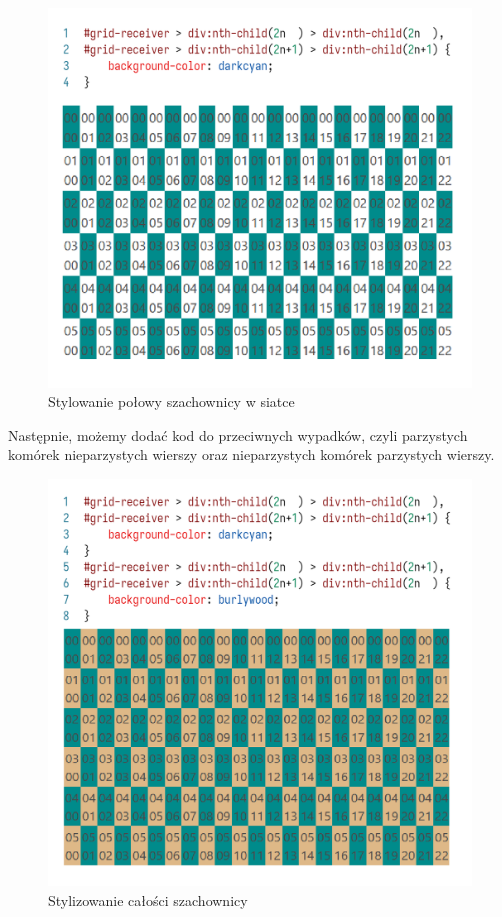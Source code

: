 \documentclass[licencjacka]{pracadypl}
\begin{document}
\begin{figure}[H]
  \centering
  \includegraphics[width=\linewidth/\real{1.6}]{images/codeui-checkerboard-half-coloring.png}
  \caption{Stylowanie połowy szachownicy w siatce}
  \label{fig:codeui-checkerboard-half-coloring}
\end{figure}

Następnie, możemy dodać kod do przeciwnych wypadków, czyli parzystych komórek nieparzystych wierszy oraz nieparzystych komórek parzystych wierszy.

\begin{figure}[H]
  \centering
  \includegraphics[width=\linewidth/\real{1.6}]{images/codeui-checkerboard-coloring.png}
  \caption{Stylizowanie całości szachownicy}
  \label{fig:codeui-checkerboard-coloring}
\end{figure}
\end{document}
